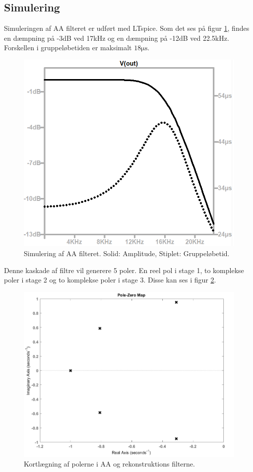 \subsection{Simulering}
Simuleringen af AA filteret er udført med LTspice. Som det ses på figur \ref{fig::anfilter_aasim}, findes en dæmpning på -3dB ved 17kHz og en dæmpning på -12dB ved 22.5kHz. Forskellen i gruppeløbetiden er maksimalt $18 \si{\micro \second}$.
\begin{figure}[h!]
	\centering
	\includegraphics[scale=0.4]{./billeder/aa_sim1}
	\caption{Simulering af AA filteret. Solid: Amplitude, Stiplet: Gruppeløbetid.}
	\label{fig::anfilter_aasim}
\end{figure}
\FloatBlock
Denne kaskade af filtre vil generere 5 poler. En reel pol i stage 1, to komplekse poler i stage 2 og to komplekse poler i stage 3. Disse kan ses i figur \ref{fig::anfilter_pol}.
\begin{figure}[h!]
	\centering
	\includegraphics[scale = 0.35]{./billeder/pzmap}
	\caption{Kortlægning af polerne i AA og rekonstruktions filterne.}
	\label{fig::anfilter_pol}
\end{figure}
\FloatBlock
